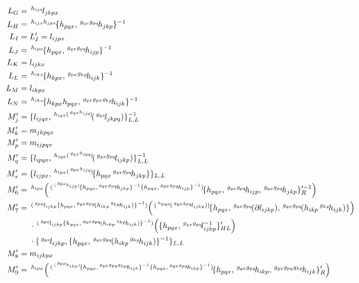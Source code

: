 \documentclass{tac}
\newcommand{\act}[1]{\,\sp{#1}\!}
\newcommand{\del}{\partial}
\begin{document}
\begin{itemize}
\begin{enumerate}[label=(\alph*)]
   \begin{align*}
   L_G &= \act{h_{ijx}}l_{jkpx}\\
   L_H &= \act{h_{ijx}h_{jpx}}\{h_{pqx},\act{g_{qx}g_{pq}}h_{jkp} \}^{-1}\\
   L_I &=L'_I =l_{ijpx}\\
   L_J &=\act{h_{ipx}}\{h_{pqx}, \act{g_{qx}g_{pq}}h_{ijp}\}^{-1} \\
   L_K &=l_{ijkx} \\
   L_L &=\act{h_{ikx}}\{h_{kpx}, \act{g_{px}g_{kp}}h_{ijk} \}^{-1}\\
   L_M &= l_{ikpx} \\
   L_N &= \act{h_{ikx}}\{h_{kpx}h_{pqx}, \act{g_{qx}g_{px}g_{kp}}h_{ijk} \}^{-1}\\
   M'_j &= \{l_{ijqx}, \act{h_{iqx}(\act{g_{qx}h_{ijq}})}(\act{g_{qx}}l_{jkpq}) \}^{-1}_{L,L}\\
   M'_k &= m_{jkpqx}\\
   M'_p &= m_{ijpqx}\\
   M'_q &= \{l_{ipqx}, \act{h_{iqx}(\act{g_{qx}h_{ipq}})}(\act{g_{qx}g_{pq}}l_{ijkp}) \}^{-1}_{L,L}\\
   M'_x &=\{l_{ijpx}, \act{h_{ipx}(\act{g_{px}h_{ijq}})}\{h_{pqx} \act{g_{qx}g_{pq} }h_{jkp}  \}\}_{L,L} \\
   M'_6 &=\act{h_{ipx}}\left(\act{(\act{(\act{g_{px}}h_{ijp})}\{h_{pqx}, \act{g_{qx}g_{pq}}h_{jkp} \}^{-1}\{h_{pqx}, \act{g_{qx}g_{pq}}h_{ijp} \}^{-1} ) }\{h_{pqx}, \act{g_{qx}g_{pq}}h_{ijp},\act{g_{qx}g_{pq}}h_{jkp} \}'^{-1}_{R}  \right)\\
   M'_7 &= \act{  (\act{g_{px}}l_{ijkp}\{h_{pqx}, \act{g_{qx}g_{pq}}(h_{ikp}\act{g_{kp}}h_{ijk}) \}^{-1})      }
  \left(  \act{(\act{h_{pqx}}(\act{g_{qx}g_{pq}}l_{ijkp}))}\{h_{pqx}, \act{g_{qx}g_{pq}}(\del l_{ijkp}),\act{g_{qx}g_{pq}}(h_{ikp}\act{g_{kp}}h_{ijk}) \}\right) \\
  &\ \ \ \ \cdot \act{  (\act{g_{px}}l_{ijkp}\{h_{pqx}, \act{g_{qx}g_{pq}}(h_{ikp}\act{g_{kp}}h_{ijk}) \}^{-1})      }\left(\{h_{pqx}, \act{g_{qx}g_{pq}}l_{ijkp}^{-1}\}'_{HL}
  \right)    \\
  &\ \ \ \ \cdot \{ \act{g_{px}}l_{ijkp}, \{h_{pqx}, \act{g_{qx}g_{pq}}(h_{ikp}\act{g_{kp}}h_{ijk}) \}^{-1}\}_{L,L}\\
     M'_8 &=m_{ijkpx}\\
   M'_9 &= \act{h_{ipx}}\left(\act{(\act{(\act{g_{px}}h_{ikp})}\{h_{pqx}, \act{g_{qx}g_{pq}g_{kp}}h_{ijk} \}^{-1}\{h_{pqx}, \act{g_{qx}g_{pq}}h_{ikp} \}^{-1} ) }\{h_{pqx}, \act{g_{qx}g_{pq}}h_{ikp},\act{g_{qx}g_{pq}g_{kp}}h_{ijk} \}'_{R}  \right)\\

\end{align*}
\end{enumerate}
\end{itemize}
\end{document}
